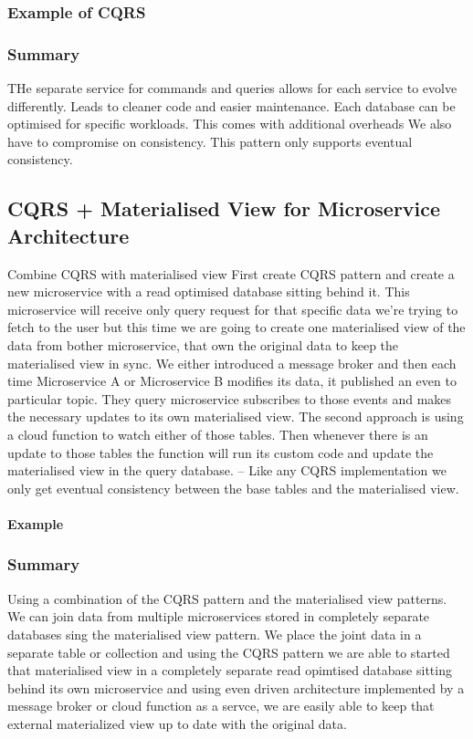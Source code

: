 \documentclass[a4paper, 11pt]{book}
\begin{document}
    \subsubsection{Example of CQRS}

    \subsubsection{Summary}
    THe separate service for commands and queries allows for each service to evolve differently.
    Leads to cleaner code and easier maintenance.
    Each database can be optimised for specific workloads.
    This comes with additional overheads
    We also have to compromise on consistency.
    This pattern only supports eventual consistency.

    \subsection{CQRS + Materialised View for Microservice Architecture}
    Combine CQRS with materialised view
    First create CQRS pattern and create a new microservice with a read optimised database sitting behind it.
    This microservice will receive only query request for that specific data we're trying to fetch to the user but this time we are going to create one materialised view of the data from bother microservice, that own the original data to keep the materialised view in sync.
    We either introduced a message broker and then each time Microservice A or Microservice B modifies its data, it published an even to particular topic.
    They query microservice subscribes to those events and makes the necessary updates to its own materialised view.
    The second approach is using a cloud function to watch either of those tables.
    Then whenever there is an update to those tables the function will run its custom code and update the materialised view in the query database.
    -- Like any CQRS implementation we only get eventual consistency between the base tables and the materialised view.

    \paragraph{Example}

    \subsubsection{Summary}
    Using a combination of the CQRS pattern and the materialised view patterns.
    We can join data from multiple microservices stored in completely separate databases sing the materialised view pattern.
    We place the joint data in a separate table or collection and using the CQRS pattern we are able to started that materialised view in a completely separate read opimtised database sitting behind its own microservice and using even driven architecture implemented by a message broker or cloud function as a servce, we are easily able to keep that external materialized view up to date with the original data.
\end{document}
